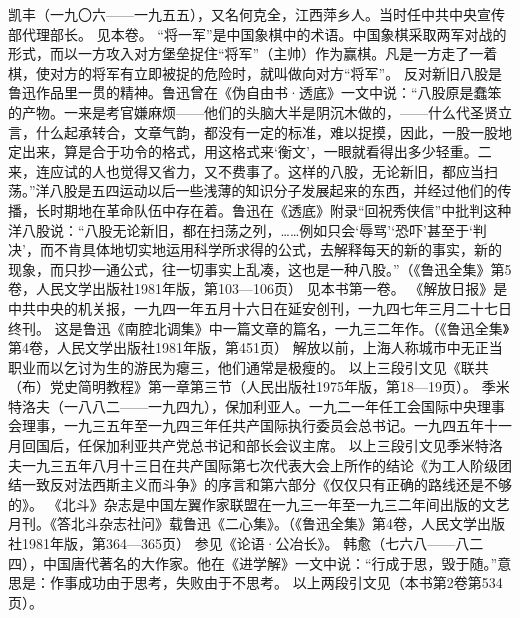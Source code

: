 \begin{maonote}
凯丰（一九〇六——一九五五），又名何克全，江西萍乡人。当时任中共中央宣传部代理部长。
见本卷。
“将一军”是中国象棋中的术语。中国象棋采取两军对战的形式，而以一方攻入对方堡垒捉住“将军”（主帅）作为赢棋。凡是一方走了一着棋，使对方的将军有立即被捉的危险时，就叫做向对方“将军”。
反对新旧八股是鲁迅作品里一贯的精神。鲁迅曾在《伪自由书·透底》一文中说：“八股原是蠢笨的产物。一来是考官嫌麻烦——他们的头脑大半是阴沉木做的，——什么代圣贤立言，什么起承转合，文章气韵，都没有一定的标准，难以捉摸，因此，一股一股地定出来，算是合于功令的格式，用这格式来‘衡文’，一眼就看得出多少轻重。二来，连应试的人也觉得又省力，又不费事了。这样的八股，无论新旧，都应当扫荡。”洋八股是五四运动以后一些浅薄的知识分子发展起来的东西，并经过他们的传播，长时期地在革命队伍中存在着。鲁迅在《透底》附录“回祝秀侠信”中批判这种洋八股说：“八股无论新旧，都在扫荡之列，……例如只会‘辱骂’‘恐吓’甚至于‘判决’，而不肯具体地切实地运用科学所求得的公式，去解释每天的新的事实，新的现象，而只抄一通公式，往一切事实上乱凑，这也是一种八股。”（《鲁迅全集》第5卷，人民文学出版社1981年版，第103—106页）
见本书第一卷。
《解放日报》是中共中央的机关报，一九四一年五月十六日在延安创刊，一九四七年三月二十七日终刊。
这是鲁迅《南腔北调集》中一篇文章的篇名，一九三二年作。（《鲁迅全集》第4卷，人民文学出版社1981年版，第451页）
解放以前，上海人称城市中无正当职业而以乞讨为生的游民为瘪三，他们通常是极瘦的。
以上三段引文见《联共（布）党史简明教程》第一章第三节（人民出版社1975年版，第18—19页）。
季米特洛夫（一八八二——一九四九），保加利亚人。一九二一年任工会国际中央理事会理事，一九三五年至一九四三年任共产国际执行委员会总书记。一九四五年十一月回国后，任保加利亚共产党总书记和部长会议主席。
以上三段引文见季米特洛夫一九三五年八月十三日在共产国际第七次代表大会上所作的结论《为工人阶级团结一致反对法西斯主义而斗争》的序言和第六部分《仅仅只有正确的路线还是不够的》。
《北斗》杂志是中国左翼作家联盟在一九三一年至一九三二年间出版的文艺月刊。《答北斗杂志社问》载鲁迅《二心集》。（《鲁迅全集》第4卷，人民文学出版社1981年版，第364—365页）
参见《论语·公冶长》。
韩愈（七六八——八二四），中国唐代著名的大作家。他在《进学解》一文中说：“行成于思，毁于随。”意思是：作事成功由于思考，失败由于不思考。
以上两段引文见（本书第2卷第534页）。
\end{maonote}
